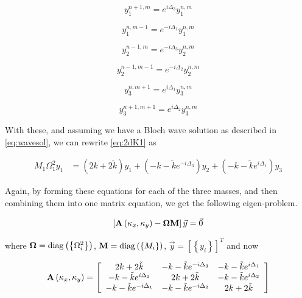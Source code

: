 \begin{equation}
  y_1^{n+1,m}=e^{i\Delta_3}y_1^{n,m}
\label{eq:kagomerelate1a}
\end{equation}

\begin{equation}
  y_1^{n,m-1}=e^{-i\Delta_1}y_1^{n,m}
\label{eq:kagomerelate1b}
\end{equation}

\begin{equation}
  y_2^{n-1,m}=e^{-i\Delta_3}y_2^{n,m}
\label{eq:kagomerelate2a}
\end{equation}

\begin{equation}
  y_2^{n-1,m-1}=e^{-i\Delta_2}y_2^{n,m}
\label{eq:kagomerelate2b}
\end{equation}

\begin{equation}
  y_3^{n,m+1}=e^{i\Delta_1}y_3^{n,m}
\label{eq:kagomerelate3a}
\end{equation}

\begin{equation}
  y_3^{n+1,m+1}=e^{i\Delta_2}y_3^{n,m}
\label{eq:kagomerelate3b}
\end{equation}

With these, and assuming we have a Bloch wave solution as described in
\eqref{eq:wavesol}, we can rewrite \eqref{eq:2dK1} as

\begin{align}
M_1\Omega_1^{2}y_1
      &=\left(2k+2\tilde{k}\right)y_1+\left(-k-\tilde{k}e^{-i\Delta_3}\right)y_2+\left(-k-\tilde{k}e^{i\Delta_1}\right)y_3
\label{eq:2dK2}
\end{align}

Again, by forming these equations for each of the three masses, and then
combining them into one matrix equation, we get the following eigen-problem.

\begin{align}
  \left[\mathbf{A}\left(\kappa_{x},\kappa_{y}\right)-\mathbf{\Omega}\mathbf{M}\right]\vec{y}=\vec{0}
\label{eq:kagomeeig}
\end{align}

where $\mathbf{\Omega}=\operatorname{diag}\left(\left\{\Omega_i^2\right\}\right)$,
$\mathbf{M}=\operatorname{diag}\left(\left\{M_i\right\}\right)$,
$\vec{y}=\left[\left\{y_i\right\}\right]^T$ and now

\begin{align}
  \mathbf{A}\left(\kappa_{x},\kappa_{y}\right)=\left[
\begin{array}{ccc}
2k+2\tilde{k} & -k-\tilde{k}e^{-i\Delta_3} & -k-\tilde{k}e^{i\Delta_1} \\
-k-\tilde{k}e^{i\Delta_3} & 2k+2\tilde{k} & -k-\tilde{k}e^{i\Delta_2} \\
-k-\tilde{k}e^{-i\Delta_1} & -k-\tilde{k}e^{-i\Delta_2} & 2k+2\tilde{k} 
\end{array}\right]
\end{align}

